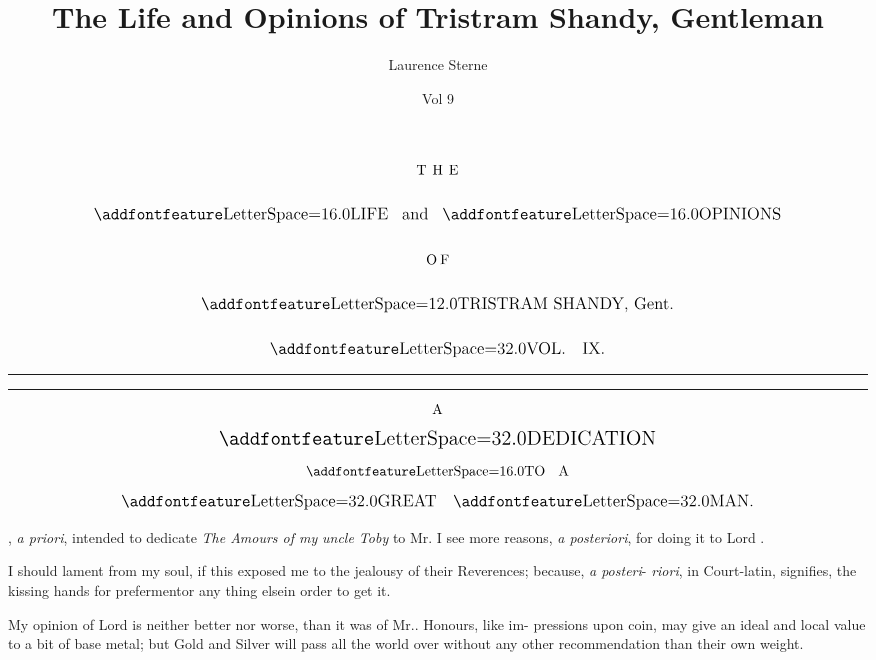 \documentclass{article}
\title{The Life and Opinions of Tristram Shandy, Gentleman}
\author{Laurence Sterne}
\date{Vol 9}
\begin{document}
\pagestyle{empty}
\null
\vfill
$$\vbox{\openup 20pt\halign{\hss #\hss\cr
\hbox to 3em{T H E}\cr
\large \lss{LIFE} \enspace and \enspace\lss{OPINIONS}\cr
\hbox to 1.6em{O F}\cr
\large \ls{TRISTRAM SHANDY}, Gent.\cr
\large \lsss{VOL}.\quad IX.\cr
}}$$
\vfill
\newpage
\null
\newpage %
\centerline{\vbox{\openup 12pt}}

\newpage
\null

\newpage
\pagestyle{dedication}
\thispagestyle{empty}
\setlength{\baselineskip}{14pt}
\hrule height 1pt
\vskip 2pt
\hrule
$$\vbox{\openup 10pt\halign{\hss #\hss\cr
A\cr
\Large \lsss{DEDICATION}\cr
\lss{TO \; A}\cr
\large\lsss{GREAT}\quad\lsss{MAN}.\cr
}}$$

\bgroup\fontsize{11}{15}\selectfont

, \textit{a priori}, intended\break
to dedicate \textit{The Amours of my}
\textit{uncle Toby} to Mr.\@ {} \tsh I see
more reasons, \textit{a posteriori}, for doing
it to Lord .

I should lament from my soul, if
this exposed me to the jealousy of
their Reverences; because, \textit{a posteri}-
\textit{riori}\sic,
in Court-latin, signifies, the\break
kissing hands for preferment\tsk or\break
any thing else\tsk in order to get it.

My opinion of Lord  is\break
neither better nor worse, than it was
of Mr.\@ {}.  Honours, like im-\break
pressions upon coin, may give an\break
ideal and local value to a bit of base
metal; but Gold and Silver will pass
all the world over without any\break 
other recommendation than their\break 
own weight.
\end{document}
